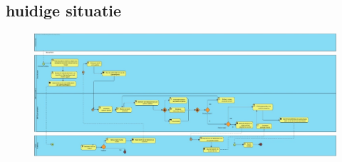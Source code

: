 \documentclass[dutch,dit,thesis]{hogentreport}
\begin{document}
\chapter{}
\label{ch:corpus}

\section{huidige situatie}

\begin{figure}
    \centering
    \includegraphics[width=\textheight,height=2\textwidth,angle=270]{huidigesituatie.jpg}

\end{figure}
\end{document}

